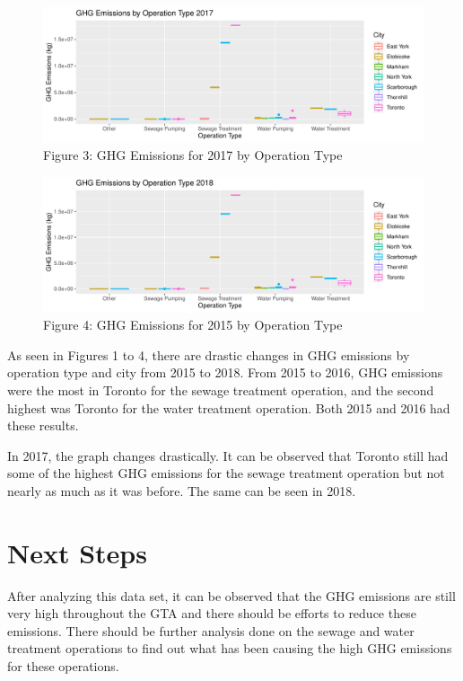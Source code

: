 \documentclass[
  letterpaper,
  DIV=11,
  numbers=noendperiod]{scrartcl}
\begin{document}
\begin{figure}

{\centering \includegraphics{paper_files/figure-pdf/unnamed-chunk-8-1.pdf}

}

\caption{Figure 3: GHG Emissions for 2017 by Operation Type}

\end{figure}

\begin{figure}

{\centering \includegraphics{paper_files/figure-pdf/unnamed-chunk-10-1.pdf}

}

\caption{Figure 4: GHG Emissions for 2015 by Operation Type}

\end{figure}

As seen in Figures 1 to 4, there are drastic changes in GHG emissions by
operation type and city from 2015 to 2018. From 2015 to 2016, GHG
emissions were the most in Toronto for the sewage treatment operation,
and the second highest was Toronto for the water treatment operation.
Both 2015 and 2016 had these results.

In 2017, the graph changes drastically. It can be observed that Toronto
still had some of the highest GHG emissions for the sewage treatment
operation but not nearly as much as it was before. The same can be seen
in 2018.

\hypertarget{next-steps}{%
\section{Next Steps}\label{next-steps}}

After analyzing this data set, it can be observed that the GHG emissions
are still very high throughout the GTA and there should be efforts to
reduce these emissions. There should be further analysis done on the
sewage and water treatment operations to find out what has been causing
the high GHG emissions for these operations.
\end{document}
